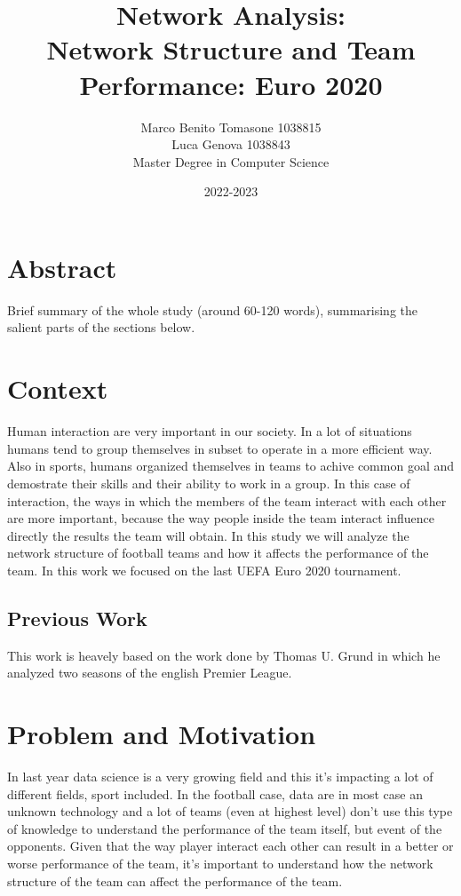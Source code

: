 \documentclass[12pt, a4paper]{article}
\author{Marco Benito Tomasone 1038815 \\ 
        Luca Genova  1038843\\
 Master Degree in Computer Science\\}
\date{2022-2023}
\title{Network Analysis:\\ Network Structure and Team Performance: Euro 2020}
\begin{document}
\maketitle

\section{Abstract}
\label{abstract-not-needed-for-the-project-proposal}

Brief summary of the whole study (around 60-120 words), summarising the
salient parts of the sections below.

\section{Context}
\label{context}
Human interaction are very important in our society. In a lot of situations humans tend to group themselves in subset to operate in a more efficient way. Also in sports, humans organized themselves in teams to achive common goal and demostrate their skills and their ability to work in a group. In this case of interaction, the ways in which the members of the team interact with each other are more important, because the way people inside the team interact influence directly the results the team will obtain. In this study we will analyze the network structure of football teams and how it affects the performance of the team. In this work we focused on the last UEFA Euro 2020 tournament.
\subsection{Previous Work}
This work is heavely based on the work done by Thomas U. Grund in which he analyzed two seasons of the english Premier League. %



\section{Problem and Motivation}
\label{problem-and-motivation}
In last year data science is a very growing field and this it's impacting a lot of different fields, sport included. In the football case, data are in most case an unknown technology and a lot of teams (even at highest level) don't use this type of knowledge to understand the performance of the team itself, but event of the opponents. Given that the way player interact each other can result in a better or worse performance of the team, it's important to understand how the network structure of the team can affect the performance of the team. 
\end{document}
